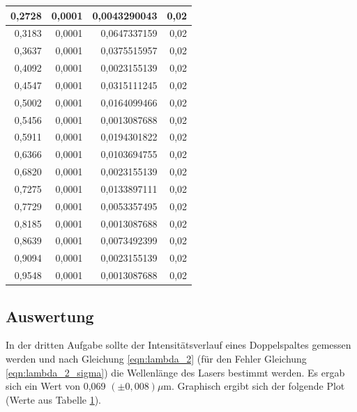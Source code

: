 \documentclass[12pt]{scrartcl}
\begin{document}
\begin{table}[H]
\begin{center}
\begin{tabular}{|r|r|r|r|}
0,2728 & 0,0001 & 0,0043290043 & 0,02 \\ \hline
0,3183 & 0,0001 & 0,0647337159 & 0,02 \\ \hline
0,3637 & 0,0001 & 0,0375515957 & 0,02 \\ \hline
0,4092 & 0,0001 & 0,0023155139 & 0,02 \\ \hline
0,4547 & 0,0001 & 0,0315111245 & 0,02 \\ \hline
0,5002 & 0,0001 & 0,0164099466 & 0,02 \\ \hline
0,5456 & 0,0001 & 0,0013087688 & 0,02 \\ \hline
0,5911 & 0,0001 & 0,0194301822 & 0,02 \\ \hline
0,6366 & 0,0001 & 0,0103694755 & 0,02 \\ \hline
0,6820 & 0,0001 & 0,0023155139 & 0,02 \\ \hline
0,7275 & 0,0001 & 0,0133897111 & 0,02 \\ \hline
0,7729 & 0,0001 & 0,0053357495 & 0,02 \\ \hline
0,8185 & 0,0001 & 0,0013087688 & 0,02 \\ \hline
0,8639 & 0,0001 & 0,0073492399 & 0,02 \\ \hline
0,9094 & 0,0001 & 0,0023155139 & 0,02 \\ \hline
0,9548 & 0,0001 & 0,0013087688 & 0,02 \\ \hline
\end{tabular}
\end{center}
\label{tab:a_3_m}
\end{table}


\subsection{Auswertung}
In der dritten Aufgabe sollte der Intensitätsverlauf eines Doppelspaltes gemessen werden und nach Gleichung \ref{eqn:lambda_2} (für den Fehler Gleichung \ref{eqn:lambda_2_sigma}) die Wellenlänge des Lasers bestimmt werden. Es ergab sich ein Wert von 0,069 $(\pm 0,008) \mu$m.
Graphisch ergibt sich der folgende Plot (Werte aus Tabelle \ref{tab:a_3_m}).
\end{document}
